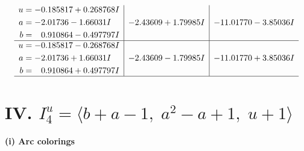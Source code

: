 \documentclass[1p]{elsarticle_modified}
\theoremstyle{definition}
\begin{document}
$$\begin{array}{c|c|c}
\begin{aligned}
u &= -0.185817 + 0.268768 I \\
a &= -2.01736 - 1.66031 I \\
b &= \phantom{-}0.910864 - 0.497797 I\end{aligned}
 & -2.43609 + 1.79985 I & -11.01770 - 3.85036 I \\ \hline\begin{aligned}
u &= -0.185817 - 0.268768 I \\
a &= -2.01736 + 1.66031 I \\
b &= \phantom{-}0.910864 + 0.497797 I\end{aligned}
 & -2.43609 - 1.79985 I & -11.01770 + 3.85036 I\\
 \hline 
 \end{array}$$\newpage\newpage\renewcommand{\arraystretch}{1}
\centering \section*{IV. $I^u_{4}= \langle b+a-1,\;a^2- a+1,\;u+1 \rangle$}
\flushleft \textbf{(i) Arc colorings}\\
\end{document}
